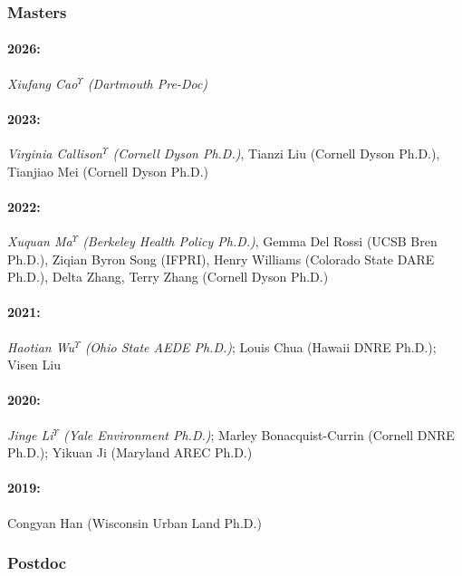 \documentclass[11pt]{res} %
\begin{document}
\begin{resume}
\subsubsection{Masters}\vspace{-.2in}
\paragraph{2026:} \textit{Xiufang Cao$^\Upsilon$ (Dartmouth Pre-Doc)}
\vspace{-.35in} 
\paragraph{2023:} \textit{Virginia Callison$^\Upsilon$ (Cornell Dyson Ph.D.)}, Tianzi Liu (Cornell Dyson Ph.D.), Tianjiao Mei (Cornell Dyson Ph.D.)
\vspace{-.35in} 
\paragraph{2022:} \textit{Xuquan Ma$^\Upsilon$ (Berkeley Health Policy Ph.D.)}, Gemma Del Rossi (UCSB Bren Ph.D.), Ziqian Byron Song (IFPRI), Henry Williams (Colorado State DARE Ph.D.), Delta Zhang, Terry Zhang (Cornell Dyson Ph.D.)
\vspace{-.35in}
\paragraph{2021:} \textit{Haotian Wu$^\Upsilon$ (Ohio State AEDE Ph.D.)}; Louis Chua (Hawaii DNRE Ph.D.); Visen Liu
\vspace{-.35in}
\paragraph{2020:} \textit{Jinge Li$^\Upsilon$ (Yale Environment Ph.D.)}; Marley Bonacquist-Currin (Cornell DNRE Ph.D.); Yikuan Ji (Maryland AREC Ph.D.)
\vspace{-.35in}
\paragraph{2019:} Congyan Han (Wisconsin Urban Land Ph.D.)

\vspace{-.2in}

\subsubsection{Postdoc}\vspace{-.2in}

\end{resume}
\end{document}
